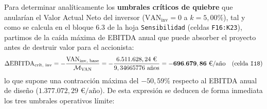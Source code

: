 \documentclass[a4paper,11pt]{report}
\providecommand{\euro}{€}
\begin{document}
Para determinar analíticamente los \textbf{umbrales críticos de quiebre} que anularían el Valor Actual Neto del inversor ($\text{VAN}_{\text{inv}} = 0$ a $k = 5,00\%$), tal y como se calcula en el bloque 6.3 de la hoja \texttt{Sensibilidad} (celdas \texttt{F16:K23}), partimos de la caída máxima de EBITDA anual que puede absorber el proyecto antes de destruir valor para el accionista:
\begin{equation}
    \Delta\text{EBITDA}_{\text{crít, inv}} = -\frac{\text{VAN}_{\text{inv, base}}}{\mathcal{M}_{\text{VAN}}} = -\frac{6.511.628,24\text{ \euro}}{9,34665776\text{ años}} = \mathbf{-696.679,86\text{ \euro/año}} \quad (\text{celda \texttt{I18}})
\end{equation}
lo que supone una contracción máxima del $-50,59\%$ respecto al EBITDA anual de diseño ($1.377.072,29\text{ \euro/año}$). De esta expresión se deducen de forma inmediata los tres umbrales operativos límite:
\end{document}
